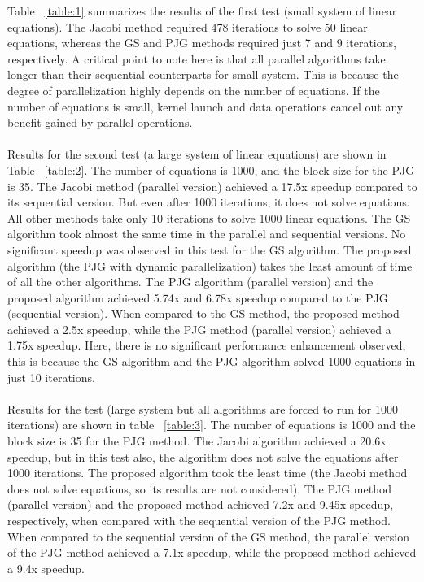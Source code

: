 \documentclass[11pt]{article}       %
\begin{document}
Table ~\ref{table:1} summarizes the results of the first test (small system of linear equations). The Jacobi method required 478 iterations to solve 50 linear equations, whereas the GS and PJG methods required just 7 and 9 iterations, respectively. A critical point to note here is that all parallel algorithms take longer than their sequential counterparts for small system. This is because the degree of parallelization highly depends on the number of equations. If the number of equations is small, kernel launch and data operations cancel out any benefit gained by parallel operations.
\\
\\
Results for the second test (a large system of linear equations) are shown in Table ~\ref{table:2}. The number of equations is 1000, and the block size for the PJG is 35. The Jacobi method (parallel version) achieved a 17.5x speedup compared to its sequential version. But even after 1000 iterations, it does not solve equations. All other methods take only 10 iterations to solve 1000 linear equations. The GS algorithm took almost the same time in the parallel and sequential versions. No significant speedup was observed in this test for the GS algorithm. The proposed algorithm (the PJG with dynamic parallelization) takes the least amount of time of all the other algorithms. The PJG algorithm (parallel version) and the proposed algorithm achieved 5.74x and 6.78x speedup compared to the PJG (sequential version). When compared to the GS method, the proposed method achieved a 2.5x speedup, while the PJG method (parallel version) achieved a 1.75x speedup. Here, there is no significant performance enhancement observed, this is because the GS algorithm and the PJG algorithm solved 1000 equations in just 10 iterations.
\\
\\
Results for the test (large system but all algorithms are forced to run for 1000 iterations) are shown in table ~\ref{table:3}. The number of equations is 1000 and the block size is 35 for the PJG method. The Jacobi algorithm achieved a 20.6x speedup, but in this test also, the algorithm does not solve the equations after 1000 iterations. The proposed algorithm took the least time (the Jacobi method does not solve equations, so its results are not considered). The PJG method (parallel version) and the proposed method achieved 7.2x and 9.45x speedup, respectively, when compared with the sequential version of the PJG method. When compared to the sequential version of the GS method, the parallel version of the PJG method achieved a 7.1x speedup, while the proposed method achieved a 9.4x speedup.
\end{document}
